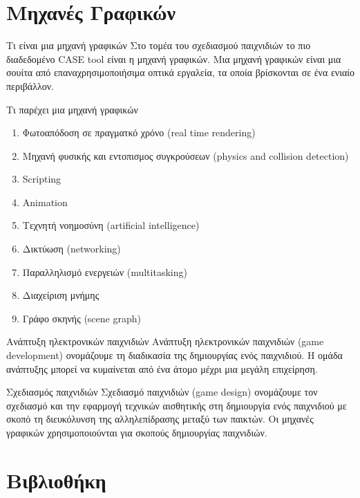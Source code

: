 \documentclass{beamer}
\begin{document}
	\section{Mηχανές Γραφικών}	
	\begin{frame}{Τι είναι μια μηχανή γραφικών}		
		Στο τομέα του σχεδιασμού παιχνιδιών το πιο διαδεδομένο CASE tool είναι η \alert{μηχανή γραφικών}. Μια μηχανή γραφικών είναι μια σουίτα από επαναχρησιμοποιήσιμα οπτικά εργαλεία, τα οποία βρίσκονται σε ένα ενιαίο περιβάλλον. 
	\end{frame}
	
	\begin{frame}{Τι παρέχει μια μηχανή γραφικών}		
	\begin{enumerate}
		\item Φωτοαπόδοση σε πραγματκό χρόνο (real time rendering)
		\item Mηχανή φυσικής και εντοπισμος συγκρούσεων (physics and collision detection)
		\item Scripting
		\item Animation
		\item Τεχνητή νοημοσύνη (artificial intelligence)
		\item Δικτύωση (networking)
		\item Παραλληλισμό ενεργειών (multitasking)
		\item Διαχείριση μνήμης
		\item Γράφο σκηνής (scene graph)
	\end{enumerate}
	\cite{gregory2009game}
	\end{frame}
		
	\begin{frame}{Ανάπτυξη ηλεκτρονικών παιχνιδιών}
		Ανάπτυξη ηλεκτρονικών παιχνιδιών (game development) ονομάζουμε τη διαδικασία της δημιουργίας ενός παιχνιδιού. Η ομάδα ανάπτυξης μπορεί να κυμαίνεται από ένα άτομο μέχρι μια μεγάλη επιχείρηση.	
	\end{frame}
	
	\begin{frame}{Σχεδιασμός παιχνιδιών}
		Σχεδιασμό παιχνιδιών (game design) ονομάζουμε τον σχεδιασμό και την εφαρμογή τεχνικών αισθητικής στη δημιουργία ενός παιχνιδιού με σκοπό τη διευκόλυνση της αλληλεπίδρασης μεταξύ των παικτών. Οι μηχανές γραφικών χρησιμοποιούνται για σκοπούς δημιουργίας παιχνιδιών.
	\end{frame}
	
	\section{Bιβλιοθήκη}
		
\end{document}

